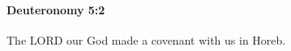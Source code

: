 
		\paragraph{Deuteronomy 5:2} %
			\label{DEUTERONOMY-5-2}

			The LORD our God made a covenant with us in Horeb.


